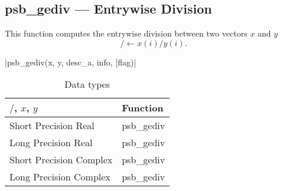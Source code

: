 \clearpage\subsection{psb\_gediv --- Entrywise Division}

This function computes the entrywise division between two vectors $x$ and
$y$
\[/ \leftarrow x(i)/y(i).\]

\fortinline|psb_gediv(x, y, desc_a, info, [flag)|

\begin{table}[h]
	\begin{center}
		\begin{tabular}{ll}
			\hline
			$/$, $x$, $y$ & {\bf Function}\\
			\hline
			Short Precision Real & psb\_gediv \\
			Long Precision Real & psb\_gediv \\
			Short Precision Complex & psb\_gediv \\
			Long Precision Complex & psb\_gediv \\
			\hline
		\end{tabular}
	\end{center}
	\caption{Data types\label{tab:f90div}}
\end{table}

